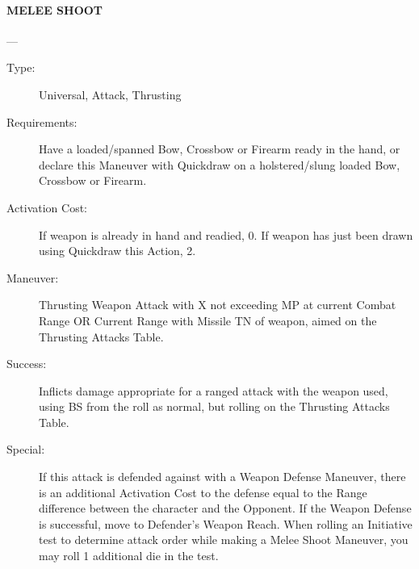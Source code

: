 \documentclass[oneside,11pt,english]{book}
\begin{document}
\paragraph{\large\label{man:MELEE SHOOT} MELEE SHOOT}---\quad{\large[X+Variable]}
\vspace{-10pt}\begin{description} 
\item [Type:] Universal, Attack, Thrusting 
\item [Requirements:] Have a loaded/spanned Bow, Crossbow or Firearm ready in the hand, or declare this 
Maneuver with Quickdraw on a holstered/slung loaded Bow, Crossbow or Firearm. 
\item [Activation Cost:] If weapon is already in hand and readied, 0. If weapon has just been drawn using 
Quickdraw this Action, 2. 
\item [Maneuver:] Thrusting Weapon Attack with X not exceeding MP at current Combat Range OR Current 
Range with Missile TN of weapon, aimed on the Thrusting Attacks Table. 
\item [Success:] Inflicts damage appropriate for a ranged attack with the weapon used, using BS from the roll as 
normal, but rolling on the Thrusting Attacks Table. 
\item [Special:] If this attack is defended against with a Weapon Defense Maneuver, there is an additional 
Activation Cost to the defense equal to the Range difference between the character and the Opponent. If 
the Weapon Defense is successful, move to Defender’s Weapon Reach. 
When rolling an Initiative test to determine attack order while making a Melee Shoot Maneuver, you may 
roll 1 additional die in the test. 
\end{description}
\end{document}
